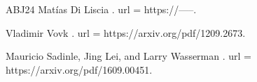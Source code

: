 \documentclass[12pt]{report}
\numberwithin{equation}{section}
\numberwithin{figure}{section}
\numberwithin{table}{section}
\theoremstyle{definition}
\begin{document}
\begin{flushleft}
\begin{thebibliography}{ABJ24}
Matías Di Liscia
.
\newblock url = {https://-----}.


Vladimir Vovk
.
\newblock url = {https://arxiv.org/pdf/1209.2673}.


Mauricio Sadinle, Jing Lei, and Larry Wasserman
.
\newblock url = {https://arxiv.org/pdf/1609.00451}.



\end{thebibliography}

\end{flushleft}
\end{document}

